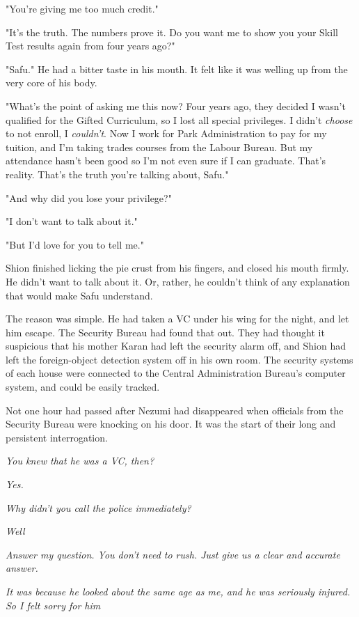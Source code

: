 "You're giving me too much credit."

"It's the truth. The numbers prove it. Do you want me to show you your
Skill Test results again from four years ago?"

"Safu." He had a bitter taste in his mouth. It felt like it was welling
up from the very core of his body.

"What's the point of asking me this now? Four years ago, they decided I
wasn't qualified for the Gifted Curriculum, so I lost all special
privileges. I didn't \emph{choose} to not enroll, I \emph{couldn't}. Now I work for
Park Administration to pay for my tuition, and I'm taking trades courses
from the Labour Bureau. But my attendance hasn't been good so I'm not
even sure if I can graduate. That's reality. That's the truth you're
talking about, Safu."

"And why did you lose your privilege?"

"I don't want to talk about it."

"But I'd love for you to tell me."

Shion finished licking the pie crust from his fingers, and closed his
mouth firmly. He didn't want to talk about it. Or, rather, he couldn't
think of any explanation that would make Safu understand.

The reason was simple. He had taken a VC under his wing for the night,
and let him escape. The Security Bureau had found that out. They had
thought it suspicious that his mother Karan had left the security alarm
off, and Shion had left the foreign-object detection system off in his
own room. The security systems of each house were connected to the
Central Administration Bureau's computer system, and could be easily
tracked.

Not one hour had passed after Nezumi had disappeared when officials from
the Security Bureau were knocking on his door. It was the start of their
long and persistent interrogation.

\emph{You knew that he was a VC, then?}

\emph{Yes.}

\emph{Why didn't you call the police immediately?}

\emph{Well\el }

\emph{Answer my question. You don't need to rush. Just give us a clear and
accurate answer.}

\emph{It was because he looked about the same age as me, and he was seriously
injured. So I felt sorry for him\el }

